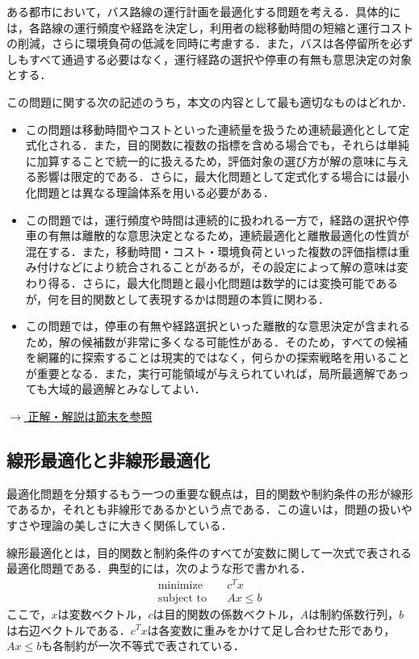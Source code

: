 \begin{example}[title={クイズ1：バス運行計画はどのタイプの最適化？}]
ある都市において，バス路線の運行計画を最適化する問題を考える．具体的には，各路線の運行頻度や経路を決定し，利用者の総移動時間の短縮と運行コストの削減，さらに環境負荷の低減を同時に考慮する．また，バスは各停留所を必ずしもすべて通過する必要はなく，運行経路の選択や停車の有無も意思決定の対象とする．

この問題に関する次の記述のうち，本文の内容として最も適切なものはどれか．

\begin{itemize}
\item[(ア)]
この問題は移動時間やコストといった連続量を扱うため連続最適化として定式化される．また，目的関数に複数の指標を含める場合でも，それらは単純に加算することで統一的に扱えるため，評価対象の選び方が解の意味に与える影響は限定的である．さらに，最大化問題として定式化する場合には最小化問題とは異なる理論体系を用いる必要がある．

\item[(イ)]
この問題では，運行頻度や時間は連続的に扱われる一方で，経路の選択や停車の有無は離散的な意思決定となるため，連続最適化と離散最適化の性質が混在する．また，移動時間・コスト・環境負荷といった複数の評価指標は重み付けなどにより統合されることがあるが，その設定によって解の意味は変わり得る．さらに，最大化問題と最小化問題は数学的には変換可能であるが，何を目的関数として表現するかは問題の本質に関わる．

\item[(ウ)]
この問題では，停車の有無や経路選択といった離散的な意思決定が含まれるため，解の候補数が非常に多くなる可能性がある．そのため，すべての候補を網羅的に探索することは現実的ではなく，何らかの探索戦略を用いることが重要となる．また，実行可能領域が与えられていれば，局所最適解であっても大域的最適解とみなしてよい．
\end{itemize}

\hyperref[ans:bus1]{$\rightarrow$ 正解・解説は節末を参照}
\end{example}

\subsection{線形最適化と非線形最適化}

最適化問題を分類するもう一つの重要な観点は，目的関数や制約条件の形が線形であるか，それとも非線形であるかという点である．この違いは，問題の扱いやすさや理論の美しさに大きく関係している．

線形最適化とは，目的関数と制約条件のすべてが変数に関して一次式で表される最適化問題である．典型的には，次のような形で書かれる．
\begin{align}
\text{minimize}\quad&c^Tx\\
\text{subject to}\quad&Ax\le b
\end{align}
ここで，$x$は変数ベクトル，$c$は目的関数の係数ベクトル，$A$は制約係数行列，$b$は右辺ベクトルである．$c^Tx$は各変数に重みをかけて足し合わせた形であり，$Ax\le b$も各制約が一次不等式で表されている．

